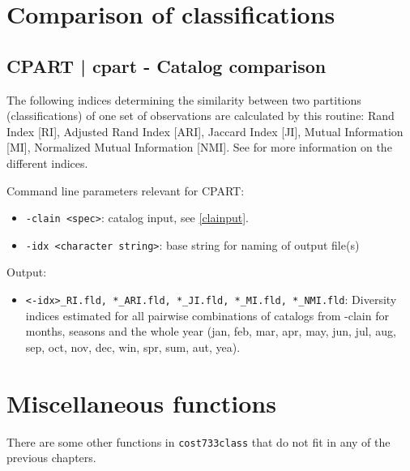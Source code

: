 \documentclass[12pt, oneside, a4paper, headsepline, plainheadsepline]{scrbook}
\begin{document}
\chapter{Comparison of classifications}
\section{CPART | cpart - Catalog comparison}

The following indices determining the similarity between two partitions (classifications) of one set of observations are calculated by this routine: Rand Index [RI], Adjusted Rand Index [ARI], Jaccard Index [JI], Mutual Information [MI], Normalized Mutual Information [NMI]. 
See \citet{Hubert1985, Kuncheva2004,Southwood1978,Strehl2002}
 \citet{Kalkstein1987}  \citet{Milligan1985}  \citet{Rand1971}  
  for more information on the different indices.

Command line parameters relevant for CPART:
\begin{itemize}
\item  \verb+-clain <spec>+:  catalog input, see \ref{clainput}.
\item  \verb+-idx <character string>+: base string for naming of output file(s)
\end{itemize}
Output:
\begin{itemize}
\item  \verb+<-idx>_RI.fld, *_ARI.fld, *_JI.fld, *_MI.fld, *_NMI.fld+: Diversity indices estimated for all pairwise combinations of catalogs from -clain for months, seasons and the whole year (jan, feb, mar, apr, may, jun, jul, aug, sep, oct, nov, dec, win, spr, sum, aut, yea).
\end{itemize}



\chapter{Miscellaneous functions}
There are some other functions in \verb+cost733class+ that do not fit in any of the previous chapters. 
\end{document}
